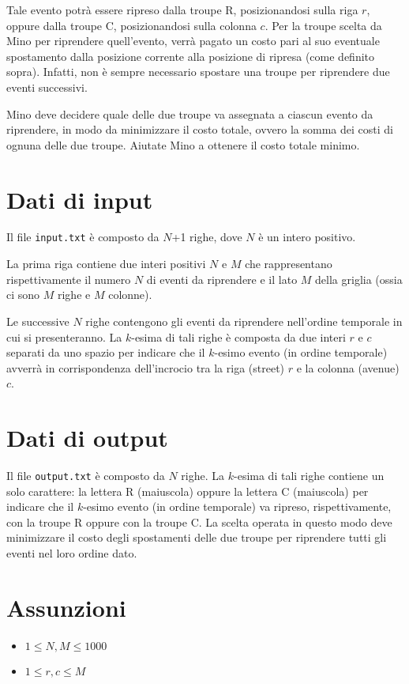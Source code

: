 \documentclass[a4paper,11pt]{article}
\begin{document}
Tale evento potrà essere ripreso dalla troupe R, posizionandosi
sulla riga $r$, oppure dalla troupe C, posizionandosi sulla
colonna $c$. Per la troupe scelta da Mino per riprendere
quell'evento, verrà pagato un costo pari al suo eventuale
spostamento dalla posizione corrente alla posizione di ripresa (come
definito sopra). Infatti, non è sempre necessario spostare una
troupe per riprendere due eventi successivi.

Mino deve decidere quale delle due troupe va assegnata a ciascun
evento da riprendere, in modo da minimizzare il costo totale, ovvero
la somma dei costi di ognuna delle due troupe. Aiutate Mino a ottenere
il costo totale minimo.


\section*{Dati di input}
  
Il file \texttt{input.txt} è composto da $N$+1
righe, dove $N$ è un intero positivo.

La prima riga contiene due interi positivi $N$ e $M$
che rappresentano rispettivamente il numero $N$ di eventi da
riprendere e il lato
$M$ della griglia (ossia ci sono $M$ righe e
$M$ colonne).

Le successive $N$ righe contengono gli eventi da riprendere
nell'ordine temporale in cui si presenteranno. La $k$-esima
di tali righe è composta da due interi $r$ e
$c$ separati da uno spazio per indicare che il
$k$-esimo evento (in ordine temporale) avverrà in
corrispondenza dell'incrocio tra la riga (street) $r$ e la
colonna (avenue) $c$.


\section*{Dati di output}
  
 Il file \texttt{output.txt} è
composto da $N$ righe. La $k$-esima di tali righe
contiene un solo carattere: la lettera R (maiuscola) oppure la lettera
C (maiuscola) per indicare che il $k$-esimo evento (in ordine
temporale) va ripreso, rispettivamente, con la troupe R oppure con la
troupe C. La scelta operata in questo modo deve minimizzare il costo
degli spostamenti delle due troupe per riprendere tutti gli eventi
nel loro ordine dato.

  \section*{Assunzioni}
  \begin{itemize}
  
    \item  $1 ≤ N, M ≤ 1000$ 
    \item  $1 ≤ r, c ≤ M$ 
  \end{itemize}
\end{document}
